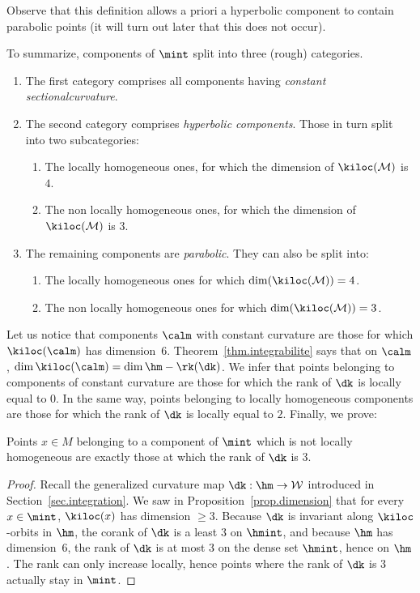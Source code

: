 Observe that this definition allows a priori a hyperbolic component to contain parabolic points (it will turn out later that this does not occur).

To summarize, components of $\mint$ split into three (rough) categories.
\begin{enumerate}
\item \label{list3.7.1}The first category comprises all components having \emph{constant sectional\linebreak curvature}. 
\item \label{list3.7.2}The second category comprises \emph{hyperbolic components}. Those in turn split into two subcategories:
\begin{enumerate}\alphenumi
\item \label{list3.7.2a}The locally homogeneous ones, for which the dimension of $\kiloc({\mathcal M})$ is~$4$.
\item \label{list3.7.2b}The non locally homogeneous ones, for which the dimension of $\kiloc({\mathcal M})$ is $3$.
\end{enumerate}
\item \label{list3.7.3}The remaining components are \emph{parabolic}. They can also be split into:
\begin{enumerate}\alphenumi
\item \label{list3.7.3a}The locally homogeneous ones for which $\dim(\kiloc({\mathcal M}))=4$.
\item \label{list3.7.3b}The non locally homogeneous ones for which $\dim(\kiloc({\mathcal M}))=3$.
\end{enumerate}
\end{enumerate}

Let us notice that components $\calm$ with constant curvature are those for which $\kiloc(\calm)$ has dimension~$6$. Theorem~\ref{thm.integrabilite} says that on $\calm$, $\dim \kiloc(\calm)=\dim \hm - \rk(\dk)$. We infer that points belonging to components of constant curvature are those for which the rank of $\dk$ is locally equal to $0$. In the same way, points belonging to locally homogeneous components are those for which the rank of $\dk$ is locally equal to $2$. Finally, we prove:

\begin{lemm}\label{lem.rank3}
Points $x \in M$ belonging to a component of $\mint$ which is not locally homogeneous are exactly those at which the rank of $\dk$ is $3$.
\end{lemm}


\begin{proof}
Recall the generalized curvature map $\dk : \hm \to {\mathcal W}$ introduced in Section~\ref{sec.integration}. We saw in Proposition~\ref{prop.dimension} that for every $x \in \mint$, $\kiloc(x)$ has dimension $\geq 3$. Because $\dk$ is invariant along $\kiloc$-orbits in $\hm$, the corank of $\dk$ is a least $3$ on $\hmint$, and because $\hm$ has dimension~$6$, the rank of $\dk$ is at most $3$ on the dense set $\hmint$, hence on $\hm$. The rank can only increase locally, hence points where the rank of $\dk$ is $3$ actually stay in $\mint$.
\end{proof}



